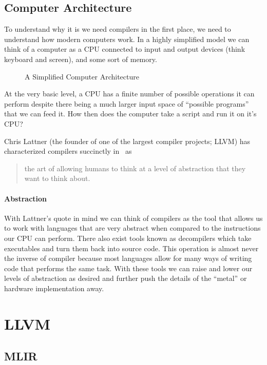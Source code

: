 \subsection{Computer Architecture}
To understand why it is we need compilers in the first place, we need to understand how modern computers work.
In a highly simplified model we can think of a computer as a \ac{CPU} connected to input and output devices (think keyboard and screen), and some sort of memory.
\begin{figure}[h]
    \centering
    \caption{A Simplified Computer Architecture}
    \label{fig:comparch}
\end{figure}

At the very basic level, a \ac{CPU} has a finite number of possible operations it can perform despite there being a much larger input space of ``possible programs'' that we can feed it.
How then does the computer take a script and run it on it's CPU?


Chris Lattner (the founder of one of the largest compiler projects; LLVM) has characterized compilers succinctly in~\cite{lattnerquote} as
\begin{quote}
    the art of allowing humans to think at a level of abstraction that they want to think about.
\end{quote}

\paragraph{Abstraction} With Lattner's quote in mind we can think of compilers as the tool that allows us to work with languages that are very abstract when compared to the instructions our \ac{CPU} can perform.
There also exist tools known as decompilers which take executables and turn them back into source code.
This operation is almost never the inverse of compiler because most languages allow for many ways of writing code that performs the same task.
With these tools we can raise and lower our levels of abstraction as desired and further push the details of the ``metal'' or hardware implementation away.


\section{LLVM}

\subsection{\acf{MLIR}}